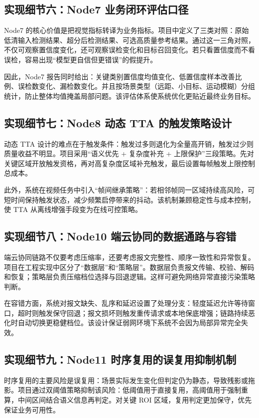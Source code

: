 \documentclass[12pt,a4paper]{ctexart}
\begin{document}
\subsection{实现细节六：Node7 业务闭环评估口径}

Node7 的核心价值是把视觉指标转译为业务指标。项目中定义了三类对照：原始低清输入检测结果、超分后检测结果、可选高质量参考结果。通过这一三角对照，不仅可观察置信度变化，还可观察误检变化和目标召回变化。若只看置信度而不看误检，容易出现“模型更自信但更错误”的假提升。

因此，Node7 报告同时给出：关键类别置信度均值变化、低置信度样本改善比例、误检数变化、漏检数变化。并且按场景类型（远距、小目标、运动模糊）分组统计，防止整体均值掩盖局部问题。该评估体系使系统优化更贴近最终业务目标。

\subsection{实现细节七：Node8 动态 TTA 的触发策略设计}

动态 TTA 设计的难点在于触发条件：触发过多则退化为全量高开销，触发过少则质量收益不明显。项目采用“语义优先 + 复杂度补充 + 上限保护”三段策略。先对关键区域开放触发资格，再对高复杂度区域补充触发，最后设置每帧触发上限控制总成本。

此外，系统在视频任务中引入“帧间继承策略”：若相邻帧同一区域持续高风险，可短时间保持触发状态，减少频繁启停带来的抖动。该机制兼顾稳定性与成本控制，使 TTA 从离线增强手段变为在线可控策略。

\subsection{实现细节八：Node10 端云协同的数据通路与容错}

端云协同链路不仅要考虑压缩率，还要考虑报文完整性、顺序一致性和异常恢复。项目在工程实现中区分了“数据层”和“策略层”。数据层负责报文传输、校验、解码和恢复；策略层负责压缩档位选择与回退逻辑。这样可避免网络异常直接污染策略判断。

在容错方面，系统对报文缺失、乱序和延迟设置了处理分支：轻度延迟允许等待窗口，超时则触发保守回退；报文损坏则触发重传请求或本地保底增强；链路持续恶化时自动切换更稳健档位。该设计保证弱网环境下系统不会因为局部异常完全失效。

\subsection{实现细节九：Node11 时序复用的误复用抑制机制}

时序复用的主要风险是误复用：场景实际发生变化但判定仍为静态，导致残影或拖影。项目通过双阈值策略抑制该风险：低阈值用于直接复用，高阈值用于强制重算，中间区间结合语义信息再判定。对关键 ROI 区域，复用判定更加保守，优先保证业务可用性。
\end{document}
